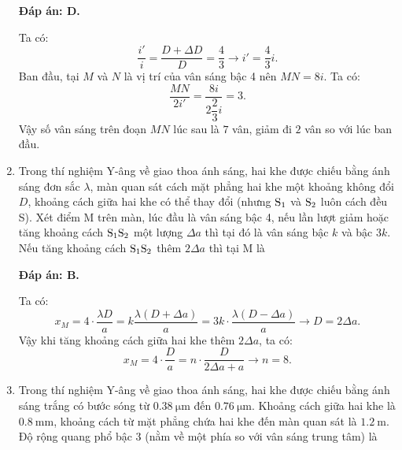 \begin{enumerate}[label=\bfseries Câu \arabic*:]
	\loigiai
	{		\textbf{Đáp án: D.}
		
Ta có:
$$
	\dfrac{i'}{i} =  \dfrac{D + \Delta D}{D} = \dfrac{4}{3} \rightarrow i' = \dfrac{4}{3} i.
$$
Ban đầu, tại $ M $ và $ N $ là vị trí của vân sáng bậc 4 nên $ MN = 8i $.			
Ta có:
$$
	\dfrac{MN}{2i'} = \dfrac{8i}{2\dfrac{2}{3}i} = \num{3}.
$$
Vậy số vân sáng trên đoạn $ MN $ lúc sau là $ 7 $ vân, giảm đi $ 2 $ vân so với lúc ban đầu.
	}
	
	\item {} 
	
	\cauhoi
	{Trong thí nghiệm Y-âng về giao thoa ánh sáng, hai khe được chiếu bằng ánh sáng đơn sắc $\lambda$, màn quan sát cách mặt phẳng hai khe một khoảng không đổi $D$, khoảng cách giữa hai khe có thể thay đổi (nhưng $\text S_1$ và $\text S_2$ luôn cách đều S). Xét điểm M trên màn, lúc đầu là vân sáng bậc 4, nếu lần lượt giảm hoặc tăng khoảng cách $\text S_1 \text S_2$ một lượng $\Delta a$ thì tại đó là vân sáng bậc $k$ và bậc $3k$. Nếu tăng khoảng cách $\text S_1 \text S_2$ thêm $2\Delta a$ thì tại M là
	}
	
	\loigiai
	{		\textbf{Đáp án: B.}
		
Ta có:
$$
	x_{M} = 4 \cdot \dfrac{\lambda D}{a} = k \dfrac{\lambda (D + \Delta a)}{a} = 3k \cdot \dfrac{\lambda (D - \Delta a)}{a} \rightarrow D = 2\Delta a.
$$
Vậy khi tăng khoảng cách giữa hai khe thêm $ 2\Delta a $, ta có:
$$
	x_{M} = 4 \cdot \dfrac{D}{a} = n \cdot \dfrac{D}{2\Delta a + a} \rightarrow n = \num{8}.
$$
		
	}
	
	\item {} 
	
	\cauhoi
	{Trong thí nghiệm Y-âng về giao thoa ánh sáng, hai khe được chiếu bằng ánh sáng trắng có bước sóng từ $\SI{0.38}{\micro \meter}$ đến $\SI{0.76}{\micro \meter}$. Khoảng cách giữa hai khe là $\SI{0.8}{\milli \meter}$, khoảng cách từ mặt phẳng chứa hai khe đến màn quan sát là $\SI{1.2}{\meter}$. Độ rộng quang phổ bậc 3 (nằm về một phía so với vân sáng trung tâm) là
	}
	

\end{enumerate}
